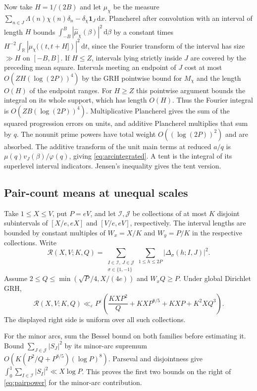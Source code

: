 \documentclass[11pt,a4paper]{article}
\numberwithin{equation}{section}
\newcommand{\ud}{\mathrm d}
\begin{document}
Now take $H=1/(2B)$ and let $\mu_\chi$ be the measure
$\sum_{n\in J}\Lambda(n)\chi(n)\delta_n-\delta_\chi\mathbf1_J\,\ud x$.
Plancherel after convolution with an interval of length $H$
bounds $\int_{-B}^B|\widehat\mu_\chi(\beta)|^2\,\ud\beta$
by a constant times
$H^{-2}\int_{\mathbb R}|\mu_\chi((t,t+H])|^2\,\ud t$,
since the Fourier transform of the interval has size
$\gg H$ on $[-B,B]$. If $H\le Z$, intervals lying strictly
inside $J$ are covered by the preceding mean square.
Intervals meeting an endpoint of $J$ cost at most
$O(ZH(\log(2P))^4)$ by the GRH pointwise bound for
$M_\chi$ and the length $O(H)$ of the endpoint ranges.
For $H\ge Z$ this pointwise argument bounds the integral
on its whole support, which has length $O(H)$.
Thus the Fourier integral is $O(ZB(\log(2P))^4)$.
Multiplicative Plancherel gives the sum of the squared
progression errors on units, and additive Plancherel
multiplies that sum by $q$. The nonunit prime powers
have total weight $O((\log(2P))^2)$ and are absorbed.
The additive transform of the unit main terms at reduced
$a/q$ is $\mu(q)v_J(\beta)/\varphi(q)$, giving
\cref{eq:arcintegrated}. A tent is the integral of its
superlevel interval indicators. Jensen's inequality gives
the tent version.

\subsection{Pair-count means at unequal scales}

Take $1\le X\le V$, put $P=eV$, and let $\mathcal I,\mathcal J$
be collections of at most $K$ disjoint subintervals of
$[X/e,eX]$ and $[V/e,eV]$, respectively. The interval lengths
are bounded by constant multiples of $W_x=X/K$ and
$W_y=P/K$ in the respective collections. Write
\[
 \mathcal R(X,V;K,Q)=
   \sum_{\substack{I\in\mathcal I,\ J\in\mathcal J\\
                   \sigma\in\{1,-1\}}}
      \sum_{1\le h\le2P}|\Delta_\sigma(h;I,J)|^2 .
\]
Assume $2\le Q\le\min(\sqrt P/4,X/(4e))$ and $W_x Q\ge P$.
Under global
Dirichlet GRH,
\begin{equation}
 \mathcal R(X,V;K,Q)\ll_\varepsilon P^\varepsilon
       \left(\frac{KX P^2}{Q}+KX P^{8/5}
            +KXP+K^2 X Q^3\right).
 \label{eq:pairpower}
\end{equation}
The displayed right side is uniform over all such collections.

For the minor arcs, sum the Bessel bound on both families
before estimating it. Bound $\sum_{J\in\mathcal J}|S_J|^2$
by its minor-arc supremum $O(K(P^2/Q+P^{8/5})(\log P)^8)$.
Parseval and disjointness give
$\int_0^1\sum_{I\in\mathcal I}|S_I|^2\ll X\log P$.
This proves the first two bounds on the right of
\cref{eq:pairpower} for the minor-arc contribution.
\end{document}

